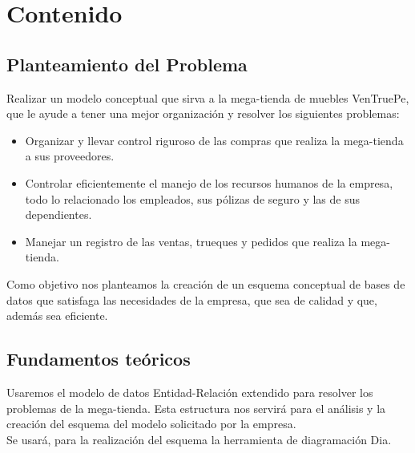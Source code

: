 \documentclass{article}
\begin{document}
   

\clearpage

\section{Contenido}

\subsection{Planteamiento del Problema}

Realizar un modelo conceptual que sirva a la mega-tienda de muebles VenTruePe, que le ayude a tener una mejor organizaci\'on y resolver los siguientes problemas:
\begin{itemize}
\item Organizar y llevar control riguroso de las compras que realiza la mega-tienda a sus proveedores. 
\item Controlar eficientemente el manejo de los recursos humanos de la empresa, todo lo relacionado los empleados, sus p\'olizas de seguro y las de sus dependientes.
\item Manejar un registro de las ventas, trueques y pedidos que realiza la mega-tienda.

\end{itemize}
 Como objetivo nos planteamos la creaci\'on de un esquema conceptual de bases de datos que satisfaga las necesidades de la empresa, que sea de calidad y que, adem\'as sea eficiente.
\subsection{Fundamentos te\'oricos}
Usaremos el modelo de datos Entidad-Relaci\'on extendido para resolver los problemas de la mega-tienda. Esta estructura nos servir\'a para el an\'alisis y la creaci\'on del esquema del modelo solicitado por la empresa.
\\

Se usar\'a, para la realizaci\'on del esquema la herramienta de diagramaci\'on Dia.

\end{document}
